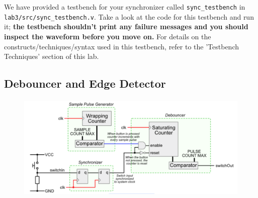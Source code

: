 \documentclass[11pt]{article}
\begin{document}
We have provided a testbench for your synchronizer called \verb|sync_testbench| in \verb|lab3/src/sync_testbench.v|. Take a look at the code for this testbench and run it; \textbf{the testbench shouldn't print any failure messages and you should inspect the waveform before you move on.} For details on the constructs/techniques/syntax used in this testbench, refer to the 'Testbench Techniques' section of this lab.






\subsection{Debouncer and Edge Detector}

\begin{figure}[H]
	\centerline{\includegraphics[height=5cm]{images/lab2_fig2.png}}
\end{figure}
\end{document}
